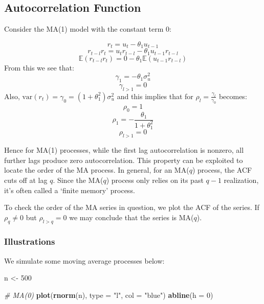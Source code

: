 \documentclass[11pt,]{article}
\newenvironment{Shaded}{\begin{snugshade}}{\end{snugshade}}
\newcommand{\KeywordTok}[1]{\textcolor[rgb]{0.13,0.29,0.53}{\textbf{#1}}}
\newcommand{\DataTypeTok}[1]{\textcolor[rgb]{0.13,0.29,0.53}{#1}}
\newcommand{\DecValTok}[1]{\textcolor[rgb]{0.00,0.00,0.81}{#1}}
\newcommand{\StringTok}[1]{\textcolor[rgb]{0.31,0.60,0.02}{#1}}
\newcommand{\CommentTok}[1]{\textcolor[rgb]{0.56,0.35,0.01}{\textit{#1}}}
\newcommand{\NormalTok}[1]{#1}
\begin{document}
\subsection{Autocorrelation Function}\label{autocorrelation-function}

Consider the MA(1) model with the constant term 0:

\[r_{t} = u_t -\theta_1u_{t-1}\]
\[r_{t-l}r_t = u_tr_{t-l} -\theta_1u_{t-1}r_{t-l}\]
\[\mathbb{E}(r_{t-l}r_t)=0-\theta_1\mathbb{E}(u_{t-1}r_{t-l})\] From
this we see that: \[\gamma_1=-\theta_1\sigma^2_u\] \[\gamma_{l>1}=0\]
Also, \(\text{var}(r_t) =\gamma_0= (1+\theta_1^2)\sigma_u^2\) and this
implies that for \(\rho_l = \frac{\gamma_l}{\gamma_0}\) becomes:
\[\rho_0 = 1\] \[\rho_1 = -\frac{\theta_1}{1+\theta_1^2}\]
\[\rho_{l>1} = 0\]

Hence for MA(1) processes, while the first lag autocorrelation is
nonzero, all further lags produce zero autocorrelation. This property
can be exploited to locate the order of the MA process. In general, for
an MA(\(q\)) process, the ACF cuts off at lag \(q\). Since the MA(\(q\))
process only relies on its past \(q-1\) realization, it's often called a
`finite memory' process.

To check the order of the MA series in question, we plot the ACF of the
series. If \(\rho_q\neq 0\) but \(\rho_{l>q}=0\) we may conclude that
the series is MA(\(q\)).

\subsubsection{Illustrations}\label{illustrations}

We simulate some moving average processes below:

\begin{Shaded}
\begin{Highlighting}[]
\NormalTok{n <-}\StringTok{ }\DecValTok{500}

\CommentTok{# MA(0)}
\KeywordTok{plot}\NormalTok{(}\KeywordTok{rnorm}\NormalTok{(n), }\DataTypeTok{type =} \StringTok{"l"}\NormalTok{, }\DataTypeTok{col =} \StringTok{"blue"}\NormalTok{)}
\KeywordTok{abline}\NormalTok{(}\DataTypeTok{h =} \DecValTok{0}\NormalTok{)}
\end{Highlighting}
\end{Shaded}
\end{document}
